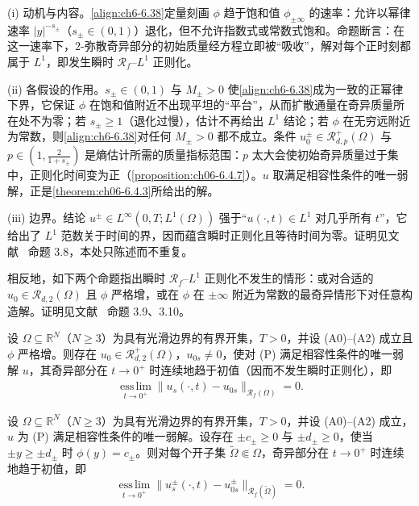 \documentclass[../../main.tex]{subfiles}%
\begin{document}
\begin{remark}\label{remark:ch06-瞬时正则动机}
(i) 动机与内容。\eqref{align:ch6-6.38}定量刻画 $\phi$ 趋于饱和值 $\phi_{\pm\infty}$ 的速率：允许以幂律速率 $|y|^{-s_\pm}$（$s_\pm\in(0,1)$）退化，但不允许指数式或常数式饱和。命题断言：在这一速率下，$2$-弥散奇异部分的初始质量经方程立即被“吸收”，解对每个正时刻都属于 $L^1$，即发生瞬时 $\mathscr{R}_f$--$L^1$ 正则化。

(ii) 各假设的作用。$s_\pm\in(0,1)$ 与 $M_\pm>0$ 使\eqref{align:ch6-6.38}成为一致的正幂律下界，它保证 $\phi$ 在饱和值附近不出现平坦的“平台”，从而扩散通量在奇异质量所在处不为零；若 $s_\pm\geqslant1$（退化过慢），估计不再给出 $L^1$ 结论；若 $\phi$ 在无穷远附近为常数，则\eqref{align:ch6-6.38}对任何 $M_\pm>0$ 都不成立。条件 $u^\pm_0\in\mathscr{R}^+_{d,p}(\Omega)$ 与 $p\in(1,\frac{2}{1+s_\pm})$ 是熵估计所需的质量指标范围：$p$ 太大会使初始奇异质量过于集中，正则化时间变为正（\cref{proposition:ch06-6.4.7}）。$u$ 取满足相容性条件的唯一弱解，正是\cref{theorem:ch06-6.4.3}所给出的解。

(iii) 边界。结论 $u^\pm\in L^\infty(0,T;L^1(\Omega))$ 强于“$u(\cdot,t)\in L^1$ 对几乎所有 $t$”，它给出了 $L^1$ 范数关于时间的界，因而蕴含瞬时正则化且等待时间为零。证明见文献~\cite{ref87} 命题 3.8，本处只陈述而不重复。
\end{remark}

相反地，如下两个命题指出瞬时 $\mathscr{R}_f$--$L^1$ 正则化不发生的情形：或对合适的 $u_0\in\mathscr{R}_{d,2}(\Omega)$ 且 $\phi$ 严格增，或在 $\phi$ 在 $\pm\infty$ 附近为常数的最奇异情形下对任意构造解。证明见文献~\cite{ref87} 命题 3.9、3.10。
\begin{proposition}\label{proposition:ch06-6.4.7}
设 $\Omega\subseteq\mathbb{R}^N$（$N\geqslant3$）为具有光滑边界的有界开集，$T>0$，并设 (A0)--(A2) 成立且 $\phi$ 严格增。则存在 $u_0\in\mathscr{R}^+_{d,2}(\Omega)$，$u_{0s}\neq0$，使对 (P) 满足相容性条件的唯一弱解 $u$，其奇异部分在 $t\to0^+$ 时连续地趋于初值（因而不发生瞬时正则化），即
\begin{align}
\operatorname*{ess\,lim}_{t\to0^+}\|u_s(\cdot,t)-u_{0s}\|_{\mathscr{R}_f(\Omega)}=0. \label{align:ch6-6.39}
\end{align}
\end{proposition}
\begin{proposition}\label{proposition:ch06-6.4.8}
设 $\Omega\subseteq\mathbb{R}^N$（$N\geqslant3$）为具有光滑边界的有界开集，$T>0$，并设 (A0)--(A2) 成立，$u$ 为 (P) 满足相容性条件的唯一弱解。设存在 $\pm c_\pm\geqslant0$ 与 $\pm d_\pm\geqslant0$，使当 $\pm y\geqslant\pm d_\pm$ 时 $\phi(y)=c_\pm$。则对每个开子集 $\widetilde\Omega\Subset\Omega$，奇异部分在 $t\to0^+$ 时连续地趋于初值，即
\begin{align}
\operatorname*{ess\,lim}_{t\to0^+}\|u^\pm_s(\cdot,t)-u^\pm_{0s}\|_{\mathscr{R}_f(\widetilde\Omega)}=0. \label{align:ch6-6.40}
\end{align}
\end{proposition}
\end{document}
